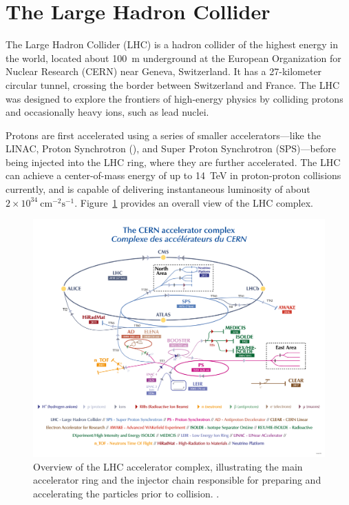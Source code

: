 \section{The Large Hadron Collider} \label{sec:LHC}
The Large Hadron Collider (LHC) is a hadron collider of the highest energy in the world, located about 100~m underground at the European Organization for Nuclear Research (CERN) near Geneva, Switzerland. It has a 27-kilometer circular tunnel, crossing the border between Switzerland and France. The LHC was designed to explore the frontiers of high-energy physics by colliding protons and occasionally heavy ions, such as lead nuclei.

Protons are first accelerated using a series of smaller accelerators—like the LINAC, Proton Synchrotron (\PS), and Super Proton Synchrotron (SPS)—before being injected into the LHC ring, where they are further accelerated. The LHC can achieve a center-of-mass energy of up to 14~TeV in proton-proton collisions currently, and is capable of delivering instantaneous luminosity of about $2 \times 10^{34}~\mathrm{cm}^{-2}\mathrm{s}^{-1}$. Figure~\ref{fig:LHC_complex} provides an overall view of the LHC complex.

\begin{figure}[htbp]
  \centering
  \includegraphics[width=1.0\textwidth]{figs/chapter1/LHC_complex.png}
  \caption{Overview of the LHC accelerator complex, illustrating the main accelerator ring and the injector chain responsible for preparing and accelerating the particles prior to collision. \cite{LHCComplex}.}
  \label{fig:LHC_complex}
\end{figure}

